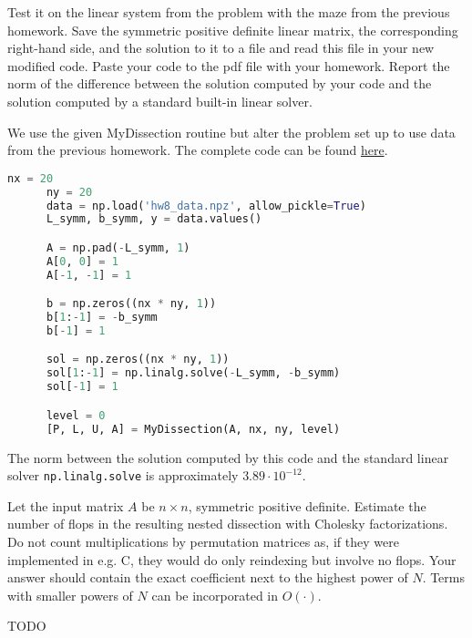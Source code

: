 \documentclass{../kin_math}
\begin{document}
\begin{questions}
  Test it on the linear system from the problem with the maze from the previous
  homework. Save the symmetric positive definite linear matrix, the corresponding
  right-hand side, and the solution to it to a file and read this file in your new modified code. Paste your code to the pdf file with your homework. Report the norm of the difference between the solution computed by your code and the solution computed by a standard built-in linear solver.
  \begin{solution}
    We use the given MyDissection routine but alter the problem set up to use data from the previous homework. The complete code can be found \href{https://github.com/elijahkin/amsc660/blob/main/hw9/hw9.ipynb}{here}.
    \begin{lstlisting}[language=Python]
      nx = 20
      ny = 20
      data = np.load('hw8_data.npz', allow_pickle=True)
      L_symm, b_symm, y = data.values()

      A = np.pad(-L_symm, 1)
      A[0, 0] = 1
      A[-1, -1] = 1

      b = np.zeros((nx * ny, 1))
      b[1:-1] = -b_symm
      b[-1] = 1

      sol = np.zeros((nx * ny, 1))
      sol[1:-1] = np.linalg.solve(-L_symm, -b_symm)
      sol[-1] = 1

      level = 0
      [P, L, U, A] = MyDissection(A, nx, ny, level)
    \end{lstlisting}
    The norm between the solution computed by this code and the standard linear solver \texttt{np.linalg.solve} is approximately $3.89 \cdot 10^{-12}$.
  \end{solution}

  \question Let the input matrix $A$ be $n \times n$, symmetric positive definite. Estimate the number of flops in the resulting nested dissection with Cholesky factorizations. Do not count multiplications by permutation matrices as, if they were implemented in e.g. C, they would do only reindexing but involve no flops. Your answer should contain the exact coefficient next to the highest power of $N$. Terms with smaller powers of $N$ can be incorporated in $O(\cdot)$.
  \begin{solution}
    TODO
  \end{solution}
\end{questions}
\end{document}
